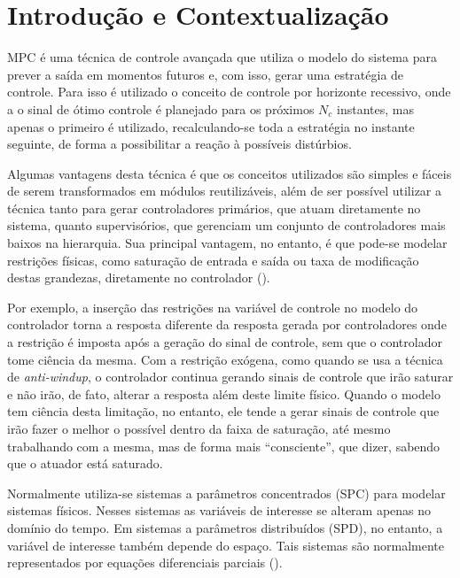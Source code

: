 
\chapter*{Introdução e Contextualização}%
\label{introducao}

MPC é uma técnica de controle avançada que utiliza o modelo do sistema para
prever a saída em momentos futuros e, com isso, gerar uma estratégia de
controle. Para isso é utilizado o conceito de controle por horizonte recessivo,
onde a o sinal de ótimo controle é planejado para os próximos \(N_c\) instantes,
mas apenas o primeiro é utilizado, recalculando-se toda a estratégia no instante
seguinte, de forma a possibilitar a reação à possíveis distúrbios.

Algumas vantagens desta técnica é que os conceitos utilizados são simples e
fáceis de serem transformados em módulos reutilizáveis, além de ser possível
utilizar a técnica tanto para gerar controladores primários, que atuam
diretamente no sistema, quanto supervisórios, que gerenciam um conjunto de
controladores mais baixos na hierarquia. Sua principal vantagem, no entanto, é
que pode-se modelar restrições físicas, como saturação de entrada e saída ou
taxa de modificação destas grandezas, diretamente no controlador
(\textcite{book:wang}).

Por exemplo, a inserção das restrições na variável de controle no modelo do
controlador torna a resposta diferente da resposta gerada por controladores onde
a restrição é imposta após a geração do sinal de controle, sem que o controlador
tome ciência da mesma. Com a restrição exógena, como quando se usa a técnica de
\textit{anti-windup}, o controlador continua gerando sinais de controle que irão
saturar e não irão, de fato, alterar a resposta além deste limite físico. Quando
o modelo tem ciência desta limitação, no entanto, ele tende a gerar sinais de
controle que irão fazer o melhor o possível dentro da faixa de saturação, até
mesmo trabalhando com a mesma, mas de forma mais \enquote{consciente}, que
dizer, sabendo que o atuador está saturado.

Normalmente utiliza-se sistemas a parâmetros concentrados (SPC) para modelar
sistemas físicos. Nesses sistemas as variáveis de interesse se alteram apenas no
domínio do tempo. Em sistemas a parâmetros distribuídos (SPD), no entanto, a
variável de interesse também depende do espaço. Tais sistemas são normalmente
representados por equações diferenciais parciais
(\textcite{masterthesis:nelson}).

